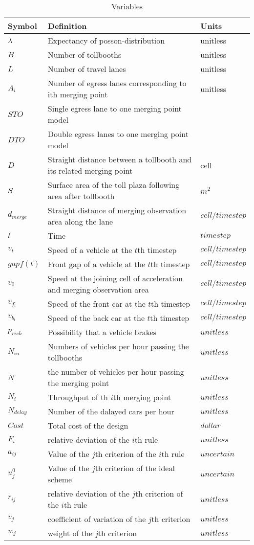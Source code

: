 \begin{table}[h]
\centering
\begin{tabular}{|l|l|l|}
\hline
Symbol &Definition & Units\\
\hline
$\lambda$&Expectancy of posson-distribution&unitless\\
\hline
$B$&Number of tollbooths&unitless\\
\hline
$L$&Number of travel lanes&unitless\\
\hline
$A_i$&Number of egress lanes corresponding to ith merging point&unitless\\
\hline
$STO$&Single egress lane to one merging point model&\\
\hline
$DTO$&Double egress lanes to one merging point model&\\
\hline
$D$&Straight distance between a tollbooth and its related merging point&cell\\
\hline
$S$&Surface area of the toll plaza following area after tollbooth&$m^2$\\
\hline
$d_{merge}$&Straight distance of merging observation area along the lane&$cell/timestep$\\
\hline
$t$&Time&$timestep$\\
\hline
$v_t$&Speed of a vehicle at the $t$th timestep&$cell/timestep$\\
\hline
$gapf(t)$&Front gap of a vehicle at the $t$th timestep&$cell/timestep$\\
\hline
$v_0$&Speed at the joining cell of acceleration and merging observation area&$cell/timestep$\\
\hline
$v_{f_t}$&Speed of the front car at the $t$th timestep &$cell/timestep$\\
\hline
$v_{b_t}$&Speed of the back car at the $t$th timestep &$cell/timestep$\\
\hline
$p_{risk}$&Possibility that a vehicle brakes&$unitless$\\
\hline
$N_{in}$&Numbers of vehicles per hour passing the tollbooths&$unitless$\\
\hline
$N$&the number of vehicles per hour passing the merging point&$unitless$\\
\hline
$N_i$&Throughput of th $i$th merging point&$unitless$\\
\hline
$N_{delay}$&Number of the dalayed cars per hour&$unitless$\\
\hline
$Cost$&Total cost of the design&$dollar$\\
\hline
$F_i$&relative deviation of the $i$th rule&$unitless$\\
\hline
$a_{ij}$&Value of the $j$th criterion of the $i$th rule&$uncertain$\\
\hline
$u_{j}^0$&Value of the $j$th criterion of the ideal scheme&$uncertain$\\
\hline
$r_{ij}$&relative deviation of the $j$th criterion of the $i$th rule&$unitless$\\
\hline
$v_j$&coefficient of variation of the $j$th criterion&$unitless$\\
\hline
$w_j$&weight of the $j$th criterion&$unitless$\\
\hline
\end{tabular}
\caption{Variables}
\end{table}


